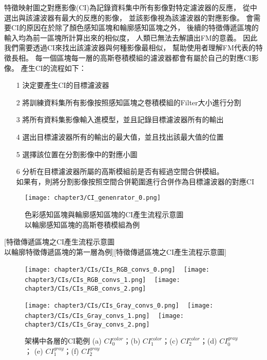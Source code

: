 \documentclass[class=NCU_thesis, crop=false]{standalone}
\begin{document}
	特徵映射圖之對應影像(CI)為記錄資料集中所有影像對特定濾波器的反應，
	從中選出與該濾波器有最大的反應的影像，
	並該影像視為該濾波器的對應影像。
	會需要CI的原因在於除了顏色感知區塊和輪廓感知區塊之外，
	後續的特徵傳遞區塊的輸入均為前一區塊所計算出來的相似度，
	人類已無法去解讀出FM的意義。
	因此我們需要透過CI來找出該濾波器與何種影像最相似，
	幫助使用者理解FM代表的特徵長相。
	每一個區塊每一層的高斯卷積模組的濾波器都會有屬於自己的對應CI影像。
	產生CI的流程如下：
	\begin{itemize}
		\item [1]
		決定要產生CI的目標濾波器
		\item [2]
		將訓練資料集所有影像按照感知區塊之卷積模組的Filter大小進行分割
		\item [3]
		將所有資料集影像輸入進模型，並且記錄目標濾波器所有的輸出
		\item [4]
		選出目標濾波器所有的輸出的最大值，並且找出該最大值的位置
		\item [5]
		選擇該位置在分割影像中的對應小圖
		\item [6]
		分析在目標濾波器所屬的高斯模組前是否有經過空間合併模組。\\
		如果有，則將分割影像按照空間合併範圍進行合併作為目標濾波器的對應CI
	\end{itemize}


	\begin{figure}[H]
	\centering
	\label{fig:CI_generator_0}
	\captionsetup{justification=centering}
	\caption{色彩感知區塊與輪廓感知區塊的CI產生流程示意圖 \\ 以輪廓感知區塊的高斯卷積模組為例}
	\texttt{[image: chapter3/CI\_genenrator\_0.png]}
	\end{figure}

	[特徵傳遞區塊之CI產生流程示意圖 \\
	以輪廓特徵傳遞區塊的第一層為例][特徵傳遞區塊之CI產生流程示意圖]

	\begin{figure}[H]
    \centering
    \subcaptionbox
        {
        \label{fig:CI_color_0}}
        {\texttt{[image: chapter3/CIs/CIs\_RGB\_convs\_0.png]}}
    ~
    \subcaptionbox
        {
        \label{fig:CI_color_1}}
        {\texttt{[image: chapter3/CIs/CIs\_RGB\_convs\_1.png]}}
    ~
    \subcaptionbox
        {
        \label{fig:CI_color_2}}
        {\texttt{[image: chapter3/CIs/CIs\_RGB\_convs\_2.png]}}

     \subcaptionbox
        {
        \label{fig:CI_gray_0}}
        {\texttt{[image: chapter3/CIs/CIs\_Gray\_convs\_0.png]}}
    ~
    \subcaptionbox
        {
        \label{fig:CI_gray_1}}
        {\texttt{[image: chapter3/CIs/CIs\_Gray\_convs\_1.png]}}
    ~
    \subcaptionbox
        {
        \label{fig:CI_gray_2}}
        {\texttt{[image: chapter3/CIs/CIs\_Gray\_convs\_2.png]}}
    \caption{架構中各層的CI範例 (a) $CI^{color}_0$；(b) $CI^{color}_1$；(c) $CI^{color}_2$；(d) $CI^{gray}_0$； (e) $CI^{gray}_1$；(f) $CI^{gray}_2$}
    \label{fig:CIs}
	\end{figure}
\end{document}
